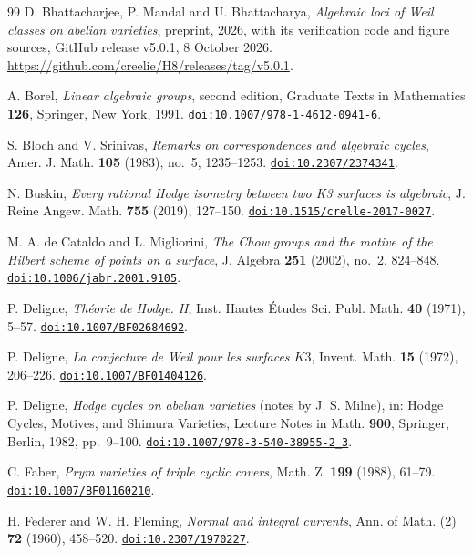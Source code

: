 \begin{thebibliography}{99}
D. Bhattacharjee, P. Mandal and U. Bhattacharya,
\emph{Algebraic loci of Weil classes on abelian varieties},
preprint, 2026, with its verification code and figure sources, GitHub release v5.0.1, 8 October 2026.
\url{https://github.com/creelie/H8/releases/tag/v5.0.1}.

A. Borel,
\emph{Linear algebraic groups}, second edition,
Graduate Texts in Mathematics \textbf{126}, Springer, New York, 1991.
\href{https://doi.org/10.1007/978-1-4612-0941-6}{\nolinkurl{doi:10.1007/978-1-4612-0941-6}}.

S. Bloch and V. Srinivas,
\emph{Remarks on correspondences and algebraic cycles},
Amer. J. Math. \textbf{105} (1983), no.~5, 1235--1253.
\href{https://doi.org/10.2307/2374341}{\nolinkurl{doi:10.2307/2374341}}.

N. Buskin,
\emph{Every rational Hodge isometry between two K3 surfaces is algebraic},
J. Reine Angew. Math. \textbf{755} (2019), 127--150.
\href{https://doi.org/10.1515/crelle-2017-0027}{\nolinkurl{doi:10.1515/crelle-2017-0027}}.

M. A. de Cataldo and L. Migliorini,
\emph{The Chow groups and the motive of the Hilbert scheme of points on a
surface},
J. Algebra \textbf{251} (2002), no.~2, 824--848.
\href{https://doi.org/10.1006/jabr.2001.9105}{\nolinkurl{doi:10.1006/jabr.2001.9105}}.

P. Deligne,
\emph{Th\'eorie de Hodge. II},
Inst. Hautes \'Etudes Sci. Publ. Math. \textbf{40} (1971), 5--57.
\href{https://doi.org/10.1007/BF02684692}{\nolinkurl{doi:10.1007/BF02684692}}.

P. Deligne,
\emph{La conjecture de Weil pour les surfaces $K3$},
Invent. Math. \textbf{15} (1972), 206--226.
\href{https://doi.org/10.1007/BF01404126}{\nolinkurl{doi:10.1007/BF01404126}}.

P. Deligne,
\emph{Hodge cycles on abelian varieties} (notes by J. S. Milne),
in: Hodge Cycles, Motives, and Shimura Varieties,
Lecture Notes in Math. \textbf{900}, Springer, Berlin, 1982, pp.~9--100.
\href{https://doi.org/10.1007/978-3-540-38955-2_3}{\nolinkurl{doi:10.1007/978-3-540-38955-2_3}}.

C. Faber,
\emph{Prym varieties of triple cyclic covers},
Math. Z. \textbf{199} (1988), 61--79.
\href{https://doi.org/10.1007/BF01160210}{\nolinkurl{doi:10.1007/BF01160210}}.

H. Federer and W. H. Fleming,
\emph{Normal and integral currents},
Ann. of Math. (2) \textbf{72} (1960), 458--520.
\href{https://doi.org/10.2307/1970227}{\nolinkurl{doi:10.2307/1970227}}.


\end{thebibliography}

